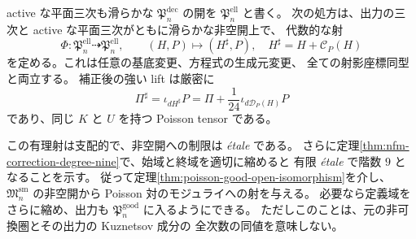 \begin{theorem}
\label{thm:nfm-algebraic-hessian-correction}
active な平面三次も滑らかな $\mathfrak P_n^{\mathrm{dec}}$ の開を
$\mathfrak P_n^{\mathrm{ell}}$ と書く。
次の処方は、出力の三次と active な平面三次がともに滑らかな非空開上で、
代数的な射
\[
 \Phi:\mathfrak P_n^{\mathrm{ell}}\dashrightarrow
             \mathfrak P_n^{\mathrm{ell}},\qquad
 (H,P)\longmapsto(H^\sharp,P),\quad H^\sharp=H+\mathcal C_P(H)
\]
を定める。これは任意の基底変更、方程式の生成元変更、
全ての射影座標同型と両立する。
補正後の強い lift は厳密に
\begin{equation}\label{eq:nfm-corrected-algebraic-tensor}
 \Pi^\sharp=\iota_{dH^\sharp}P
 =\Pi+\frac1{24}\iota_{d\mathcal D_P(H)}P
\end{equation}
であり、同じ $K$ と $U$ を持つ Poisson tensor である。

この有理射は支配的で、非空開への制限は \emph{\'etale} である。
さらに定理\ref{thm:nfm-correction-degree-nine}で、始域と終域を適切に縮めると
有限 \emph{\'etale} で階数 $9$ となることを示す。
従って定理\ref{thm:poisson-good-open-isomorphism}を介し、
$\mathfrak M_n^{\mathrm{sm}}$ の非空開から Poisson 対のモジュライへの射を与える。
必要なら定義域をさらに縮め、出力も $\mathfrak P_n^{\mathrm{good}}$ に入るようにできる。
ただしこのことは、元の非可換圏とその出力の Kuznetsov 成分の
全次数の同値を意味しない。
\end{theorem}


